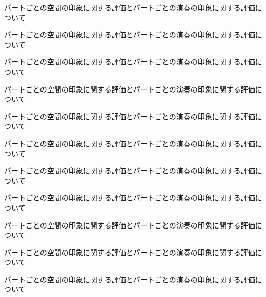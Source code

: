\documentclass[11pt,a4j]{jreport}
\begin{document}
  パートごとの空間の印象に関する評価とパートごとの演奏の印象に関する評価について

  パートごとの空間の印象に関する評価とパートごとの演奏の印象に関する評価について

  パートごとの空間の印象に関する評価とパートごとの演奏の印象に関する評価について

  パートごとの空間の印象に関する評価とパートごとの演奏の印象に関する評価について

  パートごとの空間の印象に関する評価とパートごとの演奏の印象に関する評価について

  パートごとの空間の印象に関する評価とパートごとの演奏の印象に関する評価について

  パートごとの空間の印象に関する評価とパートごとの演奏の印象に関する評価について

  パートごとの空間の印象に関する評価とパートごとの演奏の印象に関する評価について

  パートごとの空間の印象に関する評価とパートごとの演奏の印象に関する評価について

  パートごとの空間の印象に関する評価とパートごとの演奏の印象に関する評価について

  パートごとの空間の印象に関する評価とパートごとの演奏の印象に関する評価について
\end{document}
